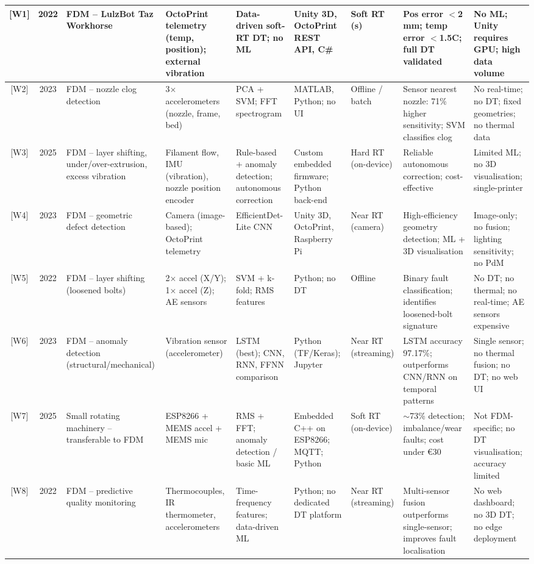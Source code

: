{\begin{xltabular}{\linewidth}{| c | c | J | J | J | J | K | J | J |}
	{[W1]} & 2022 & FDM -- LulzBot Taz Workhorse & OctoPrint telemetry (temp, position); external vibration & Data-driven soft-RT DT; no ML & Unity 3D, OctoPrint REST API, C\# & Soft RT (s) & Pos error $<$2\,mm; temp error $<$1.5\textdegree{}C; full DT validated & No ML; Unity requires GPU; high data volume \\
	\hline
	{[W2]} & 2023 & FDM -- nozzle clog detection & 3$\times$ accelerometers (nozzle, frame, bed) & PCA + SVM; FFT spectrogram & MATLAB, Python; no UI & Offline / batch & Sensor nearest nozzle: 71\% higher sensitivity; SVM classifies clog & No real-time; no DT; fixed geometries; no thermal data \\
	\hline
	{[W3]} & 2025 & FDM -- layer shifting, under/over-extrusion, excess vibration & Filament flow, IMU (vibration), nozzle position encoder & Rule-based + anomaly detection; autonomous correction & Custom embedded firmware; Python back-end & Hard RT (on-device) & Reliable autonomous correction; cost-effective & Limited ML; no 3D visualisation; single-printer \\
	\hline
	{[W4]} & 2023 & FDM -- geometric defect detection & Camera (image-based); OctoPrint telemetry & EfficientDet-Lite CNN & Unity 3D, OctoPrint, Raspberry Pi & Near RT (camera) & High-efficiency geometry detection; ML + 3D visualisation & Image-only; no fusion; lighting sensitivity; no PdM \\
	\hline
	{[W5]} & 2022 & FDM -- layer shifting (loosened bolts) & 2$\times$ accel (X/Y); 1$\times$ accel (Z); AE sensors & SVM + k-fold; RMS features & Python; no DT & Offline & Binary fault classification; identifies loosened-bolt signature & No DT; no thermal; no real-time; AE sensors expensive \\
	\hline
	{[W6]} & 2023 & FDM -- anomaly detection (structural/mechanical) & Vibration sensor (accelerometer) & LSTM (best); CNN, RNN, FFNN comparison & Python (TF/Keras); Jupyter & Near RT (streaming) & LSTM accuracy 97.17\%; outperforms CNN/RNN on temporal patterns & Single sensor; no thermal fusion; no DT; no web UI \\
	\hline
	{[W7]} & 2025 & Small rotating machinery -- transferable to FDM & ESP8266 + MEMS accel + MEMS mic & RMS + FFT; anomaly detection / basic ML & Embedded C++ on ESP8266; MQTT; Python & Soft RT (on-device) & $\sim$73\% detection; imbalance/wear faults; cost under \euro{}30 & Not FDM-specific; no DT visualisation; accuracy limited \\
	\hline
	{[W8]} & 2022 & FDM -- predictive quality monitoring & Thermocouples, IR thermometer, accelerometers & Time-frequency features; data-driven ML & Python; no dedicated DT platform & Near RT (streaming) & Multi-sensor fusion outperforms single-sensor; improves fault localisation & No web dashboard; no 3D DT; no edge deployment \\

\end{xltabular}}
